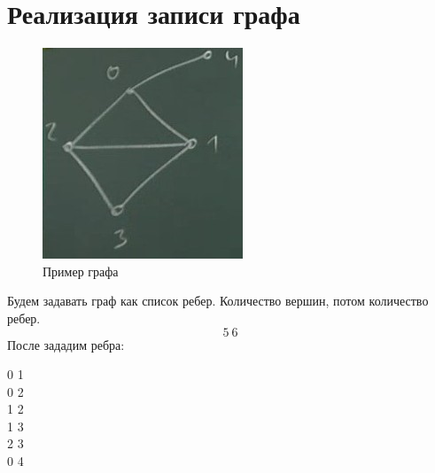 \section{Реализация записи графа}
\begin{figure}
		\begin{center}
			\includegraphics[width=\linewidth]{lection_18/graph1}
			\caption{Пример графа}
			\label{Fig:graph1}
		\end{center}
\end{figure}
Будем задавать граф как список ребер. Количество вершин, потом количество ребер.\\
$$5\ 6$$
После зададим ребра:
\begin{center}
0 1\\
0 2\\
1 2\\
1 3\\
2 3\\
0 4\\
\end{center}
